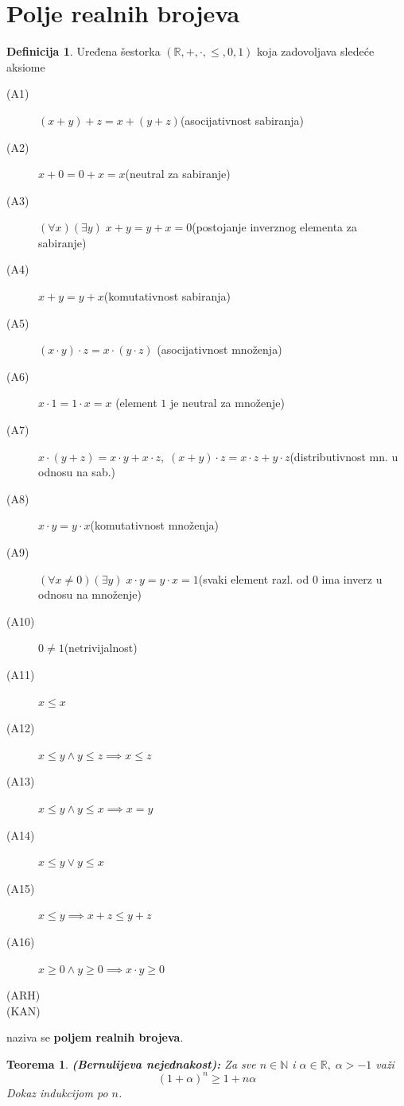 \documentclass[a4paper,12pt]{article}
\theoremstyle{plain}
\newtheorem{theorem}{Teorema}[section]
\theoremstyle{definition}
\newtheorem{definition}{Definicija}[section]
\theoremstyle{remark}
\begin{document}
\section{Polje realnih brojeva}
\begin{definition}
    Uređena šestorka $(\mathbb{R}, +, \cdot, \leq, 0, 1)$ koja zadovoljava sledeće aksiome
    \begin{description}
        \item[(A1)] $(x + y) + z = x +(y + z)$\;\;(asocijativnost sabiranja)
        \item[(A2)] $x + 0 = 0 + x = x$\;\;(neutral za sabiranje)
        \item[(A3)] $(\forall x)(\exists y)\;x + y = y + x = 0$\;\;(postojanje inverznog elementa za sabiranje) 
        \item[(A4)] $x + y = y + x$\;\;(komutativnost sabiranja)
        \item[(A5)] $(x\cdot y) \cdot z = x \cdot (y \cdot z)$\;\; (asocijativnost množenja)
        \item[(A6)] $x \cdot 1 = 1 \cdot x = x$\;\; (element $1$ je neutral za množenje)  
        \item[(A7)] $x \cdot (y + z) = x\cdot y + x\cdot z,\; (x+y)\cdot z = x\cdot z + y\cdot z$\;\;(distributivnost mn. u odnosu na sab.)
        \item[(A8)] $x \cdot y = y \cdot x$\;\;(komutativnost množenja)
        \item[(A9)] $(\forall x \neq 0)(\exists y)\;x \cdot y = y \cdot x = 1$\;\;(svaki element razl. od 0 ima inverz u odnosu na množenje)
        \item[(A10)] $0 \neq 1$\;\;(netrivijalnost)
        \item[(A11)] $x \leq x$
        \item[(A12)] $x \leq y \land y \leq z \implies x \leq z$
        \item[(A13)] $x \leq y \land y \leq x \implies x = y$
        \item[(A14)] $x \leq y \lor y \leq x$
        \item[(A15)] $x \leq y \implies x + z \leq y + z$
        \item[(A16)] $x \geq 0 \land y \geq 0 \implies x \cdot y \geq 0$
        \item[(ARH)]
        \item[(KAN)]  
    \end{description}
    naziva se \textbf{poljem realnih brojeva}.
\end{definition}
\begin{theorem}
    \textbf{(Bernulijeva nejednakost):} Za sve $n \in \mathbb{N}$ i $\alpha \in \mathbb{R},\; \alpha > -1$ važi
    \[ (1 + \alpha)^n \geq 1 + n\alpha \]
    Dokaz indukcijom po $n$.
\end{theorem}
\end{document}
